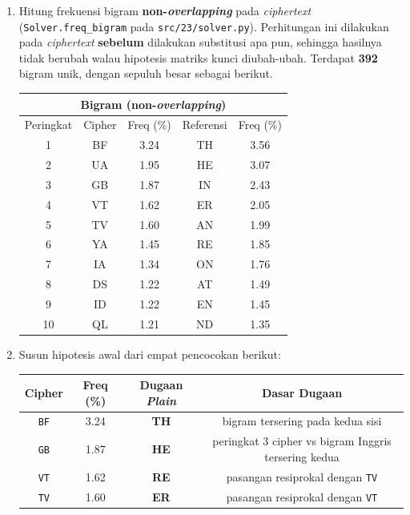 \begin{enumerate}
  \item Hitung frekuensi bigram \textbf{non-\textit{overlapping}} pada \textit{ciphertext}
  (\texttt{Solver.freq\_bigram} pada \texttt{src/23/solver.py}). Perhitungan ini dilakukan 
  pada \textit{ciphertext} \textbf{sebelum} dilakukan substitusi
  apa pun, sehingga hasilnya tidak berubah walau hipotesis matriks kunci diubah-ubah. Terdapat
  \textbf{392} bigram unik, dengan sepuluh besar sebagai berikut.

  \begin{center}
    \small
    \begin{tabular}{|c|c|c||c|c|}
      \hline
      \multicolumn{5}{|c|}{Bigram (non-\textit{overlapping})} \\
      \hline
      Peringkat & Cipher & Freq (\%) & Referensi & Freq (\%) \\
      \hline
      1  & BF & 3.24 & TH & 3.56 \\
      2  & UA & 1.95 & HE & 3.07 \\
      3  & GB & 1.87 & IN & 2.43 \\
      4  & VT & 1.62 & ER & 2.05 \\
      5  & TV & 1.60 & AN & 1.99 \\
      6  & YA & 1.45 & RE & 1.85 \\
      7  & IA & 1.34 & ON & 1.76 \\
      8  & DS & 1.22 & AT & 1.49 \\
      9  & ID & 1.22 & EN & 1.45 \\
      10 & QL & 1.21 & ND & 1.35 \\
      \hline
    \end{tabular}
  \end{center}

  \item Susun hipotesis awal dari empat pencocokan berikut:

  \begin{center}
    \small
    \begin{tabular}{|c|c|c|c|}
      \hline
      Cipher & Freq (\%) & Dugaan \textit{Plain} & Dasar Dugaan \\
      \hline
      \texttt{BF} & 3.24 & \textbf{TH} & bigram tersering pada kedua sisi \\
      \texttt{GB} & 1.87 & \textbf{HE} & peringkat 3 cipher vs bigram Inggris tersering kedua \\
      \texttt{VT} & 1.62 & \textbf{RE} & pasangan resiprokal dengan \texttt{TV} \\
      \texttt{TV} & 1.60 & \textbf{ER} & pasangan resiprokal dengan \texttt{VT} \\
      \hline
    \end{tabular}
  \end{center}


\end{enumerate}
